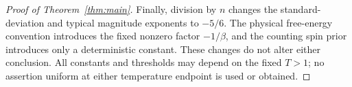 \begin{proof}[Proof of Theorem~\ref{thm:main}]
Finally, division by $n$ changes the standard-deviation and typical
magnitude exponents to $-5/6$.  The physical free-energy convention
introduces the fixed nonzero factor $-1/\beta$, and the counting spin
prior introduces only a deterministic constant.  These changes do
not alter either conclusion.  All constants and thresholds may depend
on the fixed $T>1$; no assertion uniform at either temperature endpoint
is used or obtained.
\end{proof}
